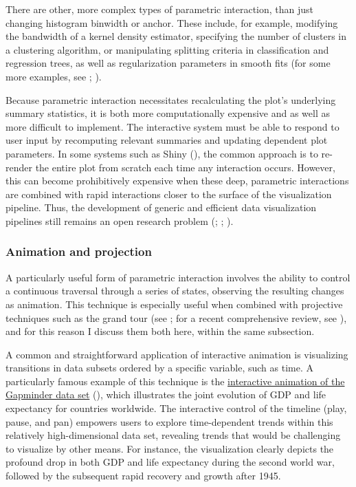 \documentclass[
]{book}
\begin{document}
There are other, more complex types of parametric interaction, than just changing histogram binwidth or anchor. These include, for example, modifying the bandwidth of a kernel density estimator, specifying the number of clusters in a clustering algorithm, or manipulating splitting criteria in classification and regression trees, as well as regularization parameters in smooth fits (for some more examples, see ; ).

Because parametric interaction necessitates recalculating the plot's underlying summary statistics, it is both more computationally expensive and as well as more difficult to implement. The interactive system must be able to respond to user input by recomputing relevant summaries and updating dependent plot parameters. In some systems such as Shiny (), the common approach is to re-render the entire plot from scratch each time any interaction occurs. However, this can become prohibitively expensive when these deep, parametric interactions are combined with rapid interactions closer to the surface of the visualization pipeline. Thus, the development of generic and efficient data visualization pipelines still remains an open research problem (; ; ).

\subsubsection{Animation and projection}\label{animation-and-projection}

A particularly useful form of parametric interaction involves the ability to control a continuous traversal through a series of states, observing the resulting changes as animation. This technique is especially useful when combined with projective techniques such as the grand tour (see ; for a recent comprehensive review, see ), and for this reason I discuss them both here, within the same subsection.

A common and straightforward application of interactive animation is visualizing transitions in data subsets ordered by a specific variable, such as time. A particularly famous example of this technique is the \href{https://www.gapminder.org/tools/\#$chart-type=bubbles&url=v2}{interactive animation of the Gapminder data set} (), which illustrates the joint evolution of GDP and life expectancy for countries worldwide. The interactive control of the timeline (play, pause, and pan) empowers users to explore time-dependent trends within this relatively high-dimensional data set, revealing trends that would be challenging to visualize by other means. For instance, the visualization clearly depicts the profound drop in both GDP and life expectancy during the second world war, followed by the subsequent rapid recovery and growth after 1945.
\end{document}
